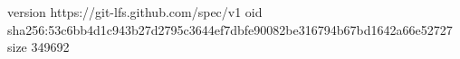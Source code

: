 version https://git-lfs.github.com/spec/v1
oid sha256:53c6bb4d1c943b27d2795c3644ef7dbfe90082be316794b67bd1642a66e52727
size 349692
